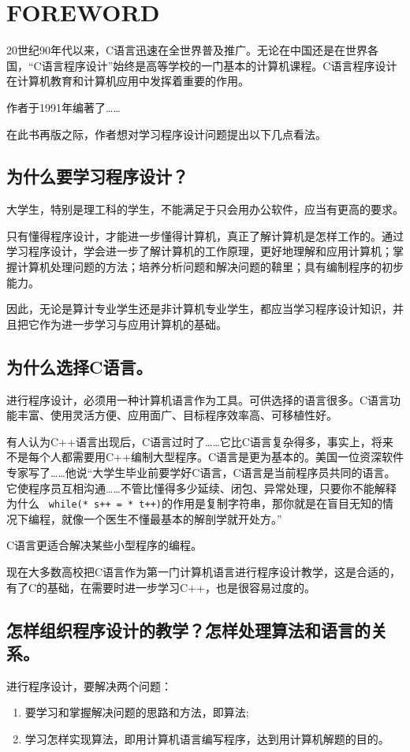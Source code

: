 \chapter{FOREWORD}
20世纪90年代以来，C语言迅速在全世界普及推广。无论在中国还是在世界各国，“C语言程序设计”始终是高等学校的一门基本的计算机课程。C语言程序设计在计算机教育和计算机应用中发挥着重要的作用。

作者于1991年编著了……

在此书再版之际，作者想对学习程序设计问题提出以下几点看法。
\section{为什么要学习程序设计？}
大学生，特别是理工科的学生，不能满足于只会用办公软件，应当有更高的要求。

只有懂得程序设计，才能进一步懂得计算机，真正了解计算机是怎样工作的。通过学习程序设计，学会进一步了解计算机的工作原理，更好地理解和应用计算机；掌握计算机处理问题的方法；培养分析问题和解决问题的鞥里；具有编制程序的初步能力。

因此，无论是算计专业学生还是非计算机专业学生，都应当学习程序设计知识，并且把它作为进一步学习与应用计算机的基础。
\section{为什么选择C语言。}

进行程序设计，必须用一种计算机语言作为工具。可供选择的语言很多。C语言功能丰富、使用灵活方便、应用面广、目标程序效率高、可移植性好。

有人认为C++语言出现后，C语言过时了……它比C语言复杂得多，事实上，将来不是每个人都需要用C++编制大型程序。C语言是更为基本的。美国一位资深软件专家写了……他说“大学生毕业前要学好C语言，C语言是当前程序员共同的语言。它使程序员互相沟通……不管比懂得多少延续、闭包、异常处理，只要你不能解释为什么 \verb| while(* s++ = * t++)|的作用是复制字符串，那你就是在盲目无知的情况下编程，就像一个医生不懂最基本的解剖学就开处方。”

C语言更适合解决某些小型程序的编程。

现在大多数高校把C语言作为第一门计算机语言进行程序设计教学，这是合适的，有了C的基础，在需要时进一步学习C++，也是很容易过度的。
\section{怎样组织程序设计的教学？怎样处理算法和语言的关系。}
进行程序设计，要解决两个问题：
	\begin{enumerate}
		\item 要学习和掌握解决问题的思路和方法，即算法;
		\item 学习怎样实现算法，即用计算机语言编写程序，达到用计算机解题的目的。
	\end{enumerate}

